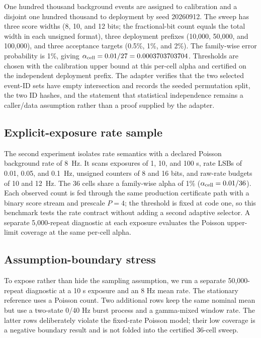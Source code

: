 \documentclass[submission, Phys]{SciPost}
\begin{document}
One hundred thousand background events are assigned to calibration and a
disjoint one hundred thousand to deployment by seed 20260912.  The sweep has
three score widths (8, 10, and 12 bits; the fractional-bit count equals the
total width in each unsigned format), three deployment prefixes (10,000,
50,000, and 100,000), and three
acceptance targets (0.5\%, 1\%, and 2\%).  The family-wise error probability is
1\%, giving $\alpha_{\rm cell}=0.01/27=0.0003703703704$.  Thresholds are chosen
with the calibration upper bound at this per-cell alpha and certified on the
independent deployment prefix.  The adapter verifies that the two selected
event-ID sets have empty intersection and records the seeded permutation split,
the two ID hashes, and the statement that statistical independence remains a
caller/data assumption rather than a proof supplied by the adapter.

\subsection{Explicit-exposure rate sample}

The second experiment isolates rate semantics with a declared Poisson
background rate of \SI{8}{Hz}.  It scans exposures of 1, 10, and 100 s, rate
LSBs of 0.01, 0.05, and \SI{0.1}{Hz}, unsigned counters of 8 and 16 bits, and
raw-rate budgets of 10 and \SI{12}{Hz}.  The 36 cells share a family-wise
alpha of 1\% ($\alpha_{\rm cell}=0.01/36$).  Each observed count is fed through
the same production certificate path with a binary score stream and prescale
$P=4$; the threshold is fixed at code one, so this benchmark tests the rate
contract without adding a second adaptive selector.  A separate 5,000-repeat
diagnostic at each exposure evaluates the Poisson upper-limit coverage at the
same per-cell alpha.

\subsection{Assumption-boundary stress}

To expose rather than hide the sampling assumption, we run a separate
50,000-repeat diagnostic at a 10 s exposure and an 8 Hz mean rate.  The
stationary reference uses a Poisson count.  Two additional rows keep the same
nominal mean but use a two-state 0/40 Hz burst process and a gamma-mixed
window rate.  The latter rows deliberately violate the fixed-rate Poisson
model; their low coverage is a negative boundary result and is not folded into
the certified 36-cell sweep.
\end{document}
